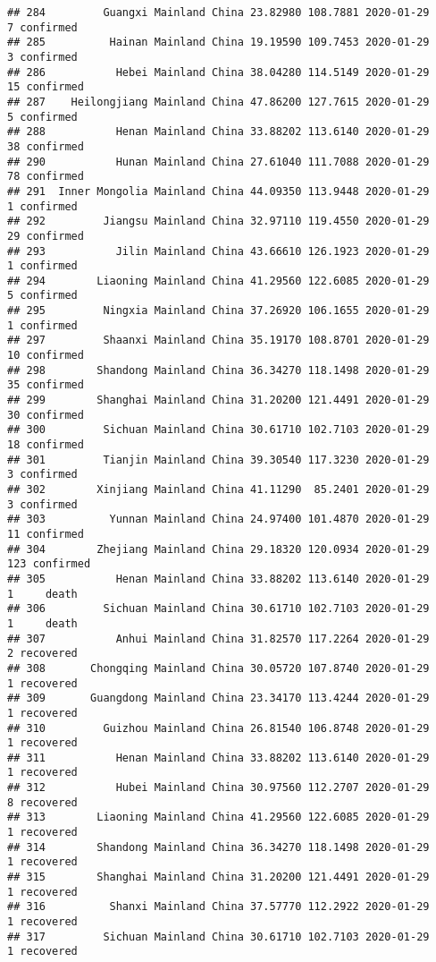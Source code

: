 \documentclass[
]{article}
\begin{document}
\begin{verbatim}
## 284         Guangxi Mainland China 23.82980 108.7881 2020-01-29     7 confirmed
## 285          Hainan Mainland China 19.19590 109.7453 2020-01-29     3 confirmed
## 286           Hebei Mainland China 38.04280 114.5149 2020-01-29    15 confirmed
## 287    Heilongjiang Mainland China 47.86200 127.7615 2020-01-29     5 confirmed
## 288           Henan Mainland China 33.88202 113.6140 2020-01-29    38 confirmed
## 290           Hunan Mainland China 27.61040 111.7088 2020-01-29    78 confirmed
## 291  Inner Mongolia Mainland China 44.09350 113.9448 2020-01-29     1 confirmed
## 292         Jiangsu Mainland China 32.97110 119.4550 2020-01-29    29 confirmed
## 293           Jilin Mainland China 43.66610 126.1923 2020-01-29     1 confirmed
## 294        Liaoning Mainland China 41.29560 122.6085 2020-01-29     5 confirmed
## 295         Ningxia Mainland China 37.26920 106.1655 2020-01-29     1 confirmed
## 297         Shaanxi Mainland China 35.19170 108.8701 2020-01-29    10 confirmed
## 298        Shandong Mainland China 36.34270 118.1498 2020-01-29    35 confirmed
## 299        Shanghai Mainland China 31.20200 121.4491 2020-01-29    30 confirmed
## 300         Sichuan Mainland China 30.61710 102.7103 2020-01-29    18 confirmed
## 301         Tianjin Mainland China 39.30540 117.3230 2020-01-29     3 confirmed
## 302        Xinjiang Mainland China 41.11290  85.2401 2020-01-29     3 confirmed
## 303          Yunnan Mainland China 24.97400 101.4870 2020-01-29    11 confirmed
## 304        Zhejiang Mainland China 29.18320 120.0934 2020-01-29   123 confirmed
## 305           Henan Mainland China 33.88202 113.6140 2020-01-29     1     death
## 306         Sichuan Mainland China 30.61710 102.7103 2020-01-29     1     death
## 307           Anhui Mainland China 31.82570 117.2264 2020-01-29     2 recovered
## 308       Chongqing Mainland China 30.05720 107.8740 2020-01-29     1 recovered
## 309       Guangdong Mainland China 23.34170 113.4244 2020-01-29     1 recovered
## 310         Guizhou Mainland China 26.81540 106.8748 2020-01-29     1 recovered
## 311           Henan Mainland China 33.88202 113.6140 2020-01-29     1 recovered
## 312           Hubei Mainland China 30.97560 112.2707 2020-01-29     8 recovered
## 313        Liaoning Mainland China 41.29560 122.6085 2020-01-29     1 recovered
## 314        Shandong Mainland China 36.34270 118.1498 2020-01-29     1 recovered
## 315        Shanghai Mainland China 31.20200 121.4491 2020-01-29     1 recovered
## 316          Shanxi Mainland China 37.57770 112.2922 2020-01-29     1 recovered
## 317         Sichuan Mainland China 30.61710 102.7103 2020-01-29     1 recovered

\end{verbatim}
\end{document}
